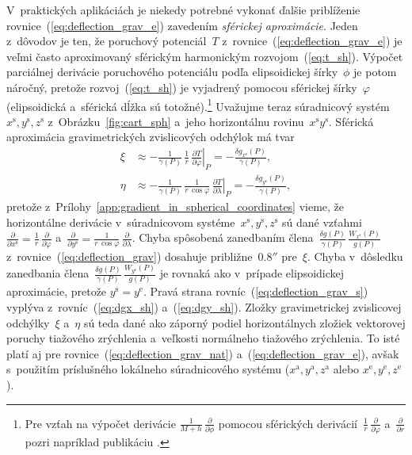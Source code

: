 \documentclass[a4paper, 12pt]{book}
\begin{document}
V~praktických aplikáciách je niekedy potrebné vykonať ďalšie priblíženie 
rovnice~(\ref{eq:deflection_grav_e}) zavedením \emph{sférickej aproximácie}.  
Jeden z~dôvodov je ten, že poruchový potenciál~$T$ 
z~rovnice~(\ref{eq:deflection_grav_e}) je veľmi často aproximovaný sférickým 
harmonickým rozvojom~(\ref{eq:t_sh}).  Výpočet parciálnej derivácie poruchového 
potenciálu podľa elipsoidickej šírky~$\phi$ je potom náročný, pretože 
rozvoj~(\ref{eq:t_sh}) je vyjadrený pomocou sférickej šírky~$\varphi$ 
(elipsoidická a~sférická dĺžka sú totožné).\footnote{Pre vzťah na výpočet 
derivácie $\frac{1}{M + h} \, \frac{\partial}{\partial\phi}$ pomocou sférických 
derivácií~$\frac{1}{r} \, \frac{\partial}{\partial \varphi}$ 
a~$\frac{\partial}{\partial r}$ pozri napríklad publikáciu 
\textcite{Jekeli1999b}.}  Uvažujme teraz súradnicový systém~$x^\mathrm{s}, 
y^\mathrm{s}, z^\mathrm{s}$ z~Obrázku~\ref{fig:cart_sph} a~jeho horizontálnu 
rovinu~$x^\mathrm{s}y^\mathrm{s}$.  Sférická aproximácia gravimetrických 
zvislicových odchýlok má tvar \parencite{Jekeli1999b}
%
\begin{equation}
\label{eq:deflection_grav_s}
\begin{split}
\xi &\approx -\frac{1}{\gamma(P)} \, \frac{1}{r} \, \left.\frac{\partial 
T}{\partial \varphi}\right|_P = -\frac{\delta 
g_{x^\mathrm{s}}(P)}{\gamma(P)}{,}\\
%
\eta &\approx -\frac{1}{\gamma(P)} \, \frac{1}{r \, \cos\varphi} \, 
\left.\frac{\partial T}{\partial \lambda}\right|_P = -\frac{\delta 
g_{y^\mathrm{s}}(P)}{\gamma(P)}{,}
\end{split}
\end{equation}
%
pretože z~Prílohy~\ref{app:gradient_in_spherical_coordinates} vieme, že 
horizontálne derivácie v~súradnicovom systéme~$x^\mathrm{s}, y^\mathrm{s}, 
z^\mathrm{s}$ sú dané vzťahmi~$\frac{\partial}{\partial x^\mathrm{s}} 
= \frac{1}{r} \, \frac{\partial}{\partial\varphi}$ a~$\frac{\partial}{\partial 
y^\mathrm{s}} = \frac{1}{r \, \cos\varphi} \, 
\frac{\partial}{\partial\lambda}$.  Chyba spôsobená zanedbaním 
člena~$\frac{\delta g(P)}{\gamma(P)} \, \frac{W_{x^\mathrm{s}}(P)}{g(P)}$ 
z~rovnice~(\ref{eq:deflection_grav}) dosahuje približne~$0.8''$ pre~$\xi$.  
Chyba v~dôsledku zanedbania člena~$\frac{\delta g(P)}{\gamma(P)} \, 
\frac{W_{y^\mathrm{s}}(P)}{g(P)}$ je rovnaká ako v~prípade elipsoidickej 
aproximácie, pretože $y^\mathrm{s} = y^\mathrm{e}$.  Pravá strana 
rovníc~(\ref{eq:deflection_grav_s}) vyplýva z~rovníc~(\ref{eq:dgx_sh}) 
a~(\ref{eq:dgy_sh}).  Zložky gravimetrickej zvislicovej odchýlky~$\xi$ a~$\eta$ 
sú teda dané ako záporný podiel horizontálnych zložiek vektorovej poruchy 
tiažového zrýchlenia a~veľkosti normálneho tiažového zrýchlenia. To isté platí 
aj pre rovnice~(\ref{eq:deflection_grav_nat}) a~(\ref{eq:deflection_grav_e}), 
avšak s~použitím príslušného lokálneho súradnicového systému ($x^\mathrm{a}, 
y^\mathrm{a}, z^\mathrm{a}$ alebo $x^\mathrm{e}, y^\mathrm{e}, z^\mathrm{e}$).
\end{document}
